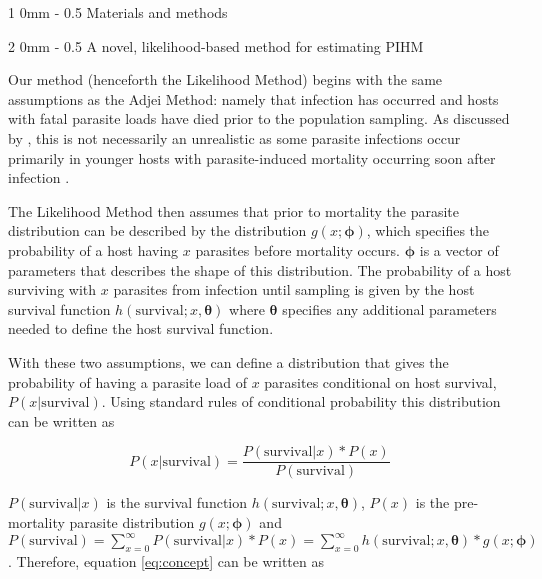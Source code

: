 \documentclass[12pt, a4paper]{article}
\makeatletter
\renewcommand{\section}{\@startsection
{section}%
{1}%
{0mm}%
{-\baselineskip}%
{0.5\baselineskip}%
{\normalfont\bf\large}} %
\renewcommand{\subsection}{\@startsection
{subsection}%
{2}%
{0mm}%
{-\baselineskip}%
{0.5\baselineskip}%
{\normalfont\bf}} %
\makeatother
\begin{document}
\section{Materials and methods}

\subsection{A novel, likelihood-based method for estimating PIHM}

Our method (henceforth the Likelihood Method) begins with the same assumptions as the Adjei Method: namely that infection has occurred and hosts with fatal parasite loads have died prior to the population sampling. As discussed by
\citeauthor{Adjei1986}, this is not necessarily an unrealistic as some parasite infections occur primarily in younger hosts with parasite-induced mortality occurring soon after infection \citep[e.g.][]{Schotthoefer2003,Johnson2008}.

The Likelihood Method then assumes that prior to mortality the parasite distribution can be described by the distribution $g(x; \boldsymbol{\phi})$, which specifies the probability of a host having $x$ parasites before mortality occurs.  $\boldsymbol{\phi}$ is a vector of parameters that describes the shape of this distribution. The probability of a host surviving with $x$ parasites from infection until sampling is given by the host survival function $h(\text{survival} ; x, \boldsymbol{\theta})$ where $\boldsymbol{\theta}$ specifies any additional parameters needed to define the host survival function.

With these two assumptions, we can define a distribution that gives the probability of having a parasite load of $x$ parasites conditional on host survival, $P(x | \text{survival})$.  Using standard rules of conditional probability this distribution can be written as

\begin{equation}
    P(x | \text{survival}) = \dfrac{P(\text{survival} | x) * P(x)}{P(\text{survival})}
    \label{eq:concept}
\end{equation}

$P(\text{survival} | x)$ is the survival function $h(\text{survival}; x, \boldsymbol{\theta})$, $P(x)$ is the pre-mortality parasite distribution $g(x; \boldsymbol{\phi})$ and $P(\text{survival}) = \sum_{x=0}^{\infty} P(\text{survival} | x) * P(x) =  \sum_{x=0}^{\infty} h(\text{survival}; x, \boldsymbol{\theta})  * g(x; \boldsymbol{\phi})$. Therefore, equation \ref{eq:concept} can be written as
\end{document}
